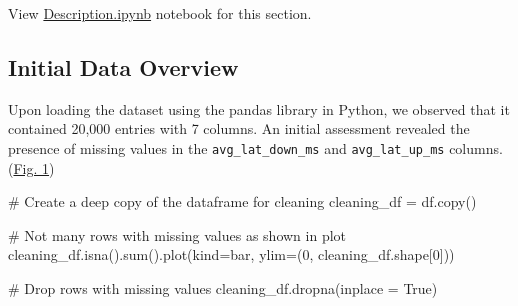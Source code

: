 \documentclass[
  letterpaper,
  DIV=11,
  numbers=noendperiod,
  oneside]{scrartcl}
\newenvironment{Shaded}{\begin{snugshade}}{\end{snugshade}}
\newcommand{\BuiltInTok}[1]{\textcolor[rgb]{0.00,0.23,0.31}{#1}}
\newcommand{\CommentTok}[1]{\textcolor[rgb]{0.37,0.37,0.37}{#1}}
\newcommand{\DecValTok}[1]{\textcolor[rgb]{0.68,0.00,0.00}{#1}}
\newcommand{\NormalTok}[1]{\textcolor[rgb]{0.00,0.23,0.31}{#1}}
\newcommand{\OperatorTok}[1]{\textcolor[rgb]{0.37,0.37,0.37}{#1}}
\newcommand{\StringTok}[1]{\textcolor[rgb]{0.13,0.47,0.30}{#1}}
\newcommand{\VariableTok}[1]{\textcolor[rgb]{0.07,0.07,0.07}{#1}}
\begin{document}
\begin{tcolorbox}[enhanced jigsaw, title=\textcolor{quarto-callout-tip-color}{\faLightbulb}\hspace{0.5em}{Description Section Source Code}, toptitle=1mm, bottomtitle=1mm, bottomrule=.15mm, toprule=.15mm, colback=white, leftrule=.75mm, colframe=quarto-callout-tip-color-frame, colbacktitle=quarto-callout-tip-color!10!white, titlerule=0mm, opacitybacktitle=0.6, arc=.35mm, rightrule=.15mm, left=2mm, breakable, opacityback=0, coltitle=black]

View
\href{https://github.com/brandon-toews/data-analytics-assignment/blob/main/Description.ipynb}{Description.ipynb}
notebook for this section.

\end{tcolorbox}

\hypertarget{initial-data-overview}{%
\subsection{Initial Data Overview}\label{initial-data-overview}}

Upon loading the dataset using the pandas library in Python, we observed
that it contained 20,000 entries with 7 columns. An initial assessment
revealed the presence of missing values in the
\texttt{avg\_lat\_down\_ms} and \texttt{avg\_lat\_up\_ms} columns.
(\protect\hyperlink{fig-missing}{Fig. 1})

\begin{Shaded}
\begin{Highlighting}[]
\CommentTok{\# Create a deep copy of the dataframe for cleaning}
\NormalTok{cleaning\_df }\OperatorTok{=}\NormalTok{ df.copy()}

\CommentTok{\# Not many rows with missing values as shown in plot}
\NormalTok{cleaning\_df.isna().}\BuiltInTok{sum}\NormalTok{().plot(kind}\OperatorTok{=}\StringTok{\textquotesingle{}bar\textquotesingle{}}\NormalTok{, ylim}\OperatorTok{=}\NormalTok{(}\DecValTok{0}\NormalTok{, cleaning\_df.shape[}\DecValTok{0}\NormalTok{]))}

\CommentTok{\# Drop rows with missing values}
\NormalTok{cleaning\_df.dropna(inplace }\OperatorTok{=} \VariableTok{True}\NormalTok{)}
\end{Highlighting}
\end{Shaded}
\end{document}

